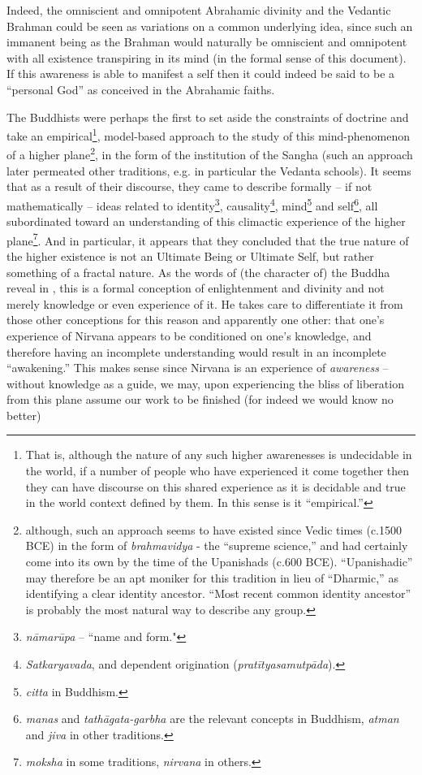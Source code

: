 \documentclass[pra,twocolumn,groupedaddress,10pt]{revtex4}
\theoremstyle{definition}
\begin{document}
Indeed, the omniscient and omnipotent Abrahamic divinity and the Vedantic Brahman could be seen as variations on a common underlying idea, since such an immanent being as the Brahman would naturally be omniscient and omnipotent with all existence transpiring in its mind (in the formal sense of this document). If this awareness is able to manifest a self then it could indeed be said to be a ``personal God'' as conceived in the Abrahamic faiths.

The Buddhists were perhaps the first to set aside the constraints of doctrine and take an empirical\footnote{That is, although the nature of any such higher awarenesses is undecidable in the world, if a number of people who have experienced it come together then they can have discourse on this shared experience as it is decidable and true in the world context defined by them. In this sense is it ``empirical.''}, model-based approach to the study of this mind-phenomenon of a higher plane\footnote{although, such an approach seems to have existed since Vedic times (c.1500 BCE) in the form of \textit{brahmavidya} - the ``supreme science,''\cite{gita} and had certainly come into its own by the time of the Upanishads (c.600 BCE). ``Upanishadic'' may therefore be an apt moniker for this tradition in lieu of ``Dharmic,'' as identifying a clear identity ancestor. ``Most recent common identity ancestor'' is probably the most natural way to describe any group.}, in the form of the institution of the Sangha (such an approach later permeated other traditions, e.g. in particular the Vedanta schools). It seems that as a result of their discourse, they came to describe formally -- if not mathematically -- ideas related to identity\footnote{\textit{n\={a}mar\={u}pa} -- ``name and form."}, causality\footnote{\textit{Satkaryavada}, and dependent origination (\textit{prat\={i}tyasamutp\={a}da}).}, mind\footnote{\textit{citta} in Buddhism.} and self\footnote{\textit{manas} and \textit{tath\={a}gata-garbha} are the relevant concepts in Buddhism, \textit{atman} and \textit{jiva} in other traditions.}, all subordinated toward an understanding of this climactic experience of the higher plane\footnote{\textit{moksha} in some traditions, \textit{nirvana} in others.}. And in particular, it appears that they concluded that the true nature of the higher existence is not an Ultimate Being or Ultimate Self, but rather something of a fractal nature. As the words of (the character of) the Buddha reveal in \cite{lankavatara}, this is a formal conception of enlightenment and divinity and not merely knowledge or even experience of it. He takes care to differentiate it from those other conceptions for this reason and apparently one other: that one's experience of Nirvana appears to be conditioned on one's knowledge, and therefore having an incomplete understanding would result in an incomplete ``awakening.'' This makes sense since Nirvana is an experience of \textit{awareness} -- without knowledge as a guide, we may, upon experiencing the bliss of liberation from this plane assume our work to be finished (for indeed we would know no better) 
\end{document}
